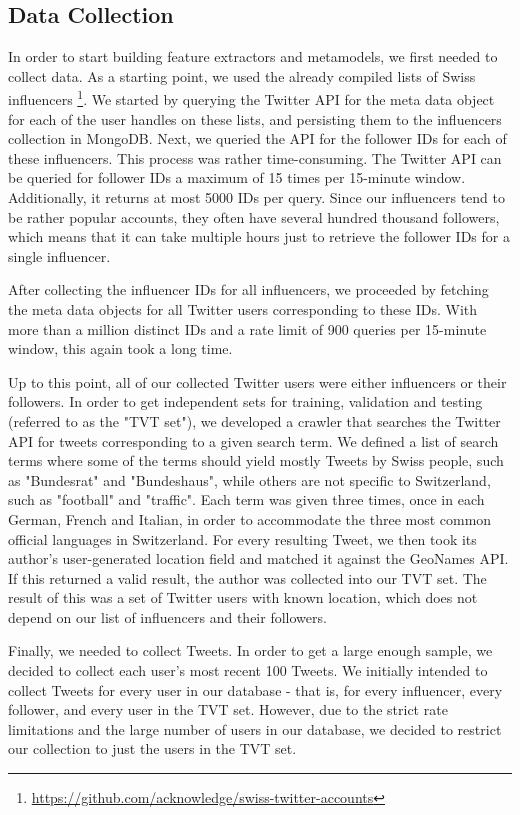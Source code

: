\documentclass[10pt,a4paper]{article}
\begin{document}
\subsection{Data Collection}
In order to start building feature extractors and metamodels, we first needed to collect data. As a starting point, we used the already compiled lists of Swiss influencers \footnote{\href{https://github.com/acknowledge/swiss-twitter-accounts}{https://github.com/acknowledge/swiss-twitter-accounts}}. We started by querying the Twitter API for the meta data object for each of the user handles on these lists, and persisting them to the influencers collection in MongoDB. Next, we queried the API for the follower IDs for each of these influencers. This process was rather time-consuming. The Twitter API can be queried for follower IDs a maximum of 15 times per 15-minute window. Additionally, it returns at most 5000 IDs per query. Since our influencers tend to be rather popular accounts, they often have several hundred thousand followers, which means that it can take multiple hours just to retrieve the follower IDs for a single influencer.

After collecting the influencer IDs for all influencers, we proceeded by fetching the meta data objects for all Twitter users corresponding to these IDs. With more than a million distinct IDs and a rate limit of 900 queries per 15-minute window, this again took a long time.

Up to this point, all of our collected Twitter users were either influencers or their followers. In order to get independent sets for training, validation and testing (referred to as the "TVT set"), we developed a crawler that searches the Twitter API for tweets corresponding to a given search term. We defined a list of search terms where some of the terms should yield mostly Tweets by Swiss people, such as "Bundesrat" and "Bundeshaus", while others are not specific to Switzerland, such as "football" and "traffic". Each term was given three times, once in each German, French and Italian, in order to accommodate the three most common official languages in Switzerland. For every resulting Tweet, we then took its author's user-generated location field and matched it against the GeoNames API. If this returned a valid result, the author was collected into our TVT set. The result of this was a set of Twitter users with known location, which does not depend on our list of influencers and their followers.

Finally, we needed to collect Tweets. In order to get a large enough sample, we decided to collect each user's most recent 100 Tweets. We initially intended to collect Tweets for every user in our database - that is, for every influencer, every follower, and every user in the TVT set. However, due to the strict rate limitations and the large number of users in our database, we decided to restrict our collection to just the users in the TVT set.
\end{document}
